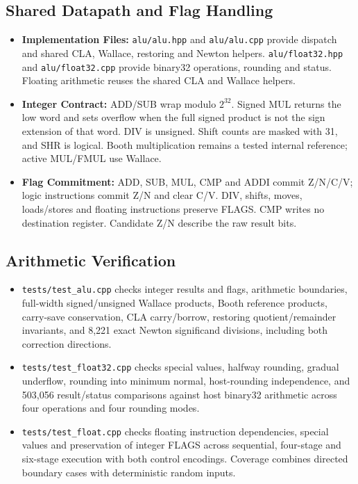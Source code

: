 \documentclass[11pt,a4paper]{article}
\begin{document}
\subsection{Shared Datapath and Flag Handling}
\begin{itemize}
    \item \textbf{Implementation Files:} \texttt{alu/alu.hpp} and \texttt{alu/alu.cpp} provide dispatch and shared CLA, Wallace, restoring and Newton helpers. \texttt{alu/float32.hpp} and \texttt{alu/float32.cpp} provide binary32 operations, rounding and status. Floating arithmetic reuses the shared CLA and Wallace helpers.
    \item \textbf{Integer Contract:} ADD/SUB wrap modulo $2^{32}$. Signed MUL returns the low word and sets overflow when the full signed product is not the sign extension of that word. DIV is unsigned. Shift counts are masked with 31, and SHR is logical. Booth multiplication remains a tested internal reference; active MUL/FMUL use Wallace.
    \item \textbf{Flag Commitment:} ADD, SUB, MUL, CMP and ADDI commit Z/N/C/V; logic instructions commit Z/N and clear C/V. DIV, shifts, moves, loads/stores and floating instructions preserve FLAGS. CMP writes no destination register. Candidate Z/N describe the raw result bits.
\end{itemize}

\subsection{Arithmetic Verification}
\begin{itemize}
    \item \texttt{tests/test\_alu.cpp} checks integer results and flags, arithmetic boundaries, full-width signed/unsigned Wallace products, Booth reference products, carry-save conservation, CLA carry/borrow, restoring quotient/remainder invariants, and 8,221 exact Newton significand divisions, including both correction directions.
    \item \texttt{tests/test\_float32.cpp} checks special values, halfway rounding, gradual underflow, rounding into minimum normal, host-rounding independence, and 503,056 result/status comparisons against host binary32 arithmetic across four operations and four rounding modes.
    \item \texttt{tests/test\_float.cpp} checks floating instruction dependencies, special values and preservation of integer FLAGS across sequential, four-stage and six-stage execution with both control encodings. Coverage combines directed boundary cases with deterministic random inputs.
\end{itemize}
\end{document}
